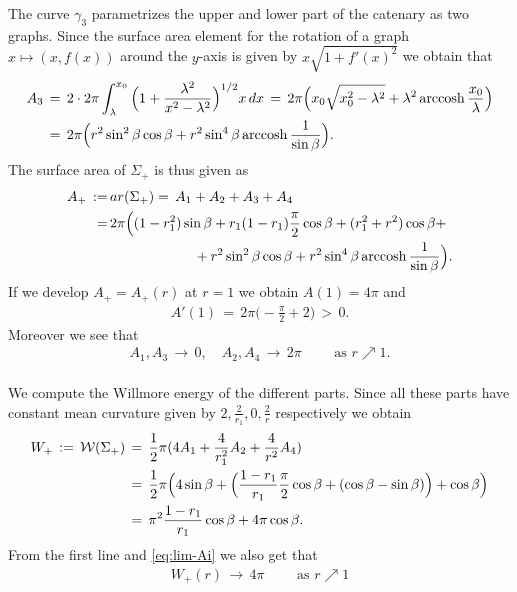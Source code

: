 \documentclass[reqno,makeidx,12pt]{amsart}
\theoremstyle{note}
\theoremstyle{definition}
\begin{document}
The curve $\gamma_3$ parametrizes the upper and lower part of the
catenary as two graphs.
Since the surface area element for the rotation of a graph $x\mapsto
(x,f(x))$ around the $y$-axis is given by $x\sqrt{1+f'(x)^2}$ we obtain
that
\begin{align}
  A_3\,&=\, 2\cdot 2\pi \int_\lambda^{x_0} \Big(1 +
  \frac{\lambda^2}{x^2-\lambda^2}\Big)^{1/2}x\,dx \,=\,
  2\pi\Big(x_0\sqrt{x_0^2-\lambda^2} +
  \lambda^2\operatorname{arccosh}\frac{x_0}{\lambda}\Big) \notag\\
  &=\, 2\pi\Big(r^2\sin^2\beta\cos\beta
  +r^2\sin^4\beta\operatorname{arccosh}\frac{1}{\sin\beta}\Big).  \label{eq:A3} 
\end{align}
The surface area of $\Sigma_+$ is thus given as
\begin{align}
  A_+\,:=\,&{ar}(\Sigma_+)
  =\, A_1 +A_2+  A_3 +A_4\notag\\
  \,=\, &2\pi\Big(
  (1-r_1^2)\sin\beta +r_1 (1-r_1)\frac{\pi}{2}\cos\beta + (r_1^2+r^2)\cos\beta
  + \notag\\
  &\qquad\qquad\qquad + r^2\sin^2\beta\cos\beta
  +r^2\sin^4\beta\operatorname{arccosh}\frac{1}{\sin\beta}\Big). \label{eq:A+}
\end{align}
If we develop $A_+=A_+(r)$ at $r=1$ we obtain $A(1)=4\pi$ and
\begin{gather}
  A'(1)\,=\, 2\pi\Big(-\frac{\pi}{2} +2\Big)\,>\,0. \label{eq:A-prime}
\end{gather}
Moreover we see that
\begin{gather}
  A_1,A_3\,\to\, 0,\quad A_2,A_4\,\to\, 2\pi\qquad\text{ as }r\nearrow 1. \label{eq:lim-Ai}
\end{gather}
{\mbox{}\\\underline{}}
We compute the Willmore energy of the different parts. Since all these
parts have constant mean curvature given by
$2,\frac{2}{r_1},0,\frac{2}{r}$ respectively we obtain
\begin{align}
  W_+\,:=\,{\mathcal{W}}(\Sigma_+)\,&=\, \frac{1}{2}\pi( 4A_1 + \frac{4}{r_1^2}A_2 +
  \frac{4}{r^2}A_4)\notag\\
  &=\, \frac{1}{2}\pi\Big(4\sin\beta + \Big(\frac{1-r_1}{r_1}\frac{\pi}{2}\cos\beta + (\cos \beta
  -\sin\beta)\Big) +  \cos\beta\Big) \notag\\
  &=\, \pi^2\frac{1-r_1}{r_1}\cos\beta + 4\pi\cos\beta. \label{eq:W-S+}
\end{align}
From the first line and \eqref{eq:lim-Ai} we also get that
\begin{gather}
  W_+(r)\,\to\, 4\pi\qquad\text{ as }r\nearrow 1 \label{eq:lim-Wi}
\end{gather}
\end{document}
